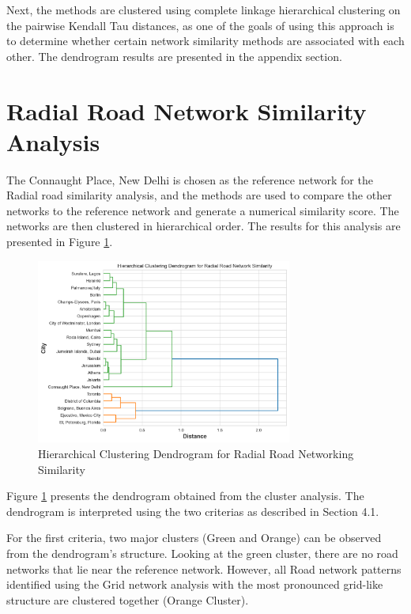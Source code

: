 Next, the methods are clustered using complete linkage hierarchical clustering on the pairwise Kendall Tau distances, as one of the goals of using this approach is to determine whether certain network similarity methods are associated with each other. The dendrogram results are presented in the appendix section.


\section{Radial Road Network Similarity Analysis}

The Connaught Place, New Delhi is chosen as the reference network for the Radial road similarity analysis, and the methods are used to compare the other networks to the reference network and generate a numerical similarity score. The networks are then clustered in hierarchical order. The results for this analysis are presented in Figure \ref{fig:Hierarchical Clustering Dendrogram for Radial Road Networking Similarity}.

\begin{figure}[!ht]
\centering
\includegraphics[width=0.75\textwidth,center]{picture/Radial/radial_dendrogram2.png}
\caption[Hierarchical Clustering Dendrogram for Radial Road Networking Similarity]{Hierarchical Clustering Dendrogram for Radial Road Networking Similarity}
\label{fig:Hierarchical Clustering Dendrogram for Radial Road Networking Similarity}
\end{figure}

Figure \ref{fig:Hierarchical Clustering Dendrogram for Radial Road Networking Similarity} presents the dendrogram obtained from the cluster analysis. The dendrogram is interpreted using the two criterias as described in Section 4.1.

For the first criteria, two major clusters (Green and Orange) can be observed from the dendrogram's structure. Looking at the green cluster, there are no road networks that lie near the reference network. However, all Road network patterns identified using the Grid network analysis with the most pronounced grid-like structure are clustered together (Orange Cluster). 

